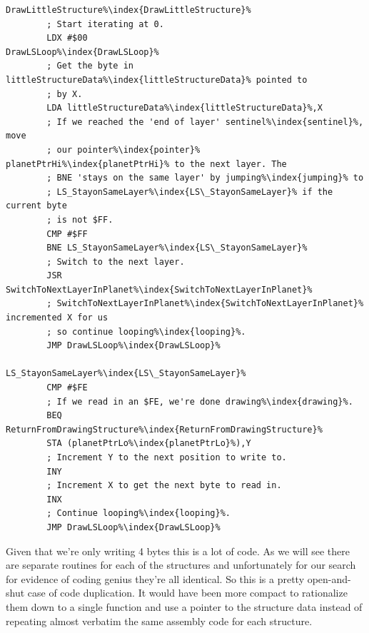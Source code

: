 \begin{lstlisting}[caption=The littlest structure\index{structure} has only two layers.,escapechar=\%]
DrawLittleStructure%\index{DrawLittleStructure}%
        ; Start iterating at 0.
        LDX #$00
DrawLSLoop%\index{DrawLSLoop}%
        ; Get the byte in littleStructureData%\index{littleStructureData}% pointed to
        ; by X.
        LDA littleStructureData%\index{littleStructureData}%,X
        ; If we reached the 'end of layer' sentinel%\index{sentinel}%, move
        ; our pointer%\index{pointer}% planetPtrHi%\index{planetPtrHi}% to the next layer. The
        ; BNE 'stays on the same layer' by jumping%\index{jumping}% to
        ; LS_StayonSameLayer%\index{LS\_StayonSameLayer}% if the current byte
        ; is not $FF.
        CMP #$FF
        BNE LS_StayonSameLayer%\index{LS\_StayonSameLayer}%
        ; Switch to the next layer.
        JSR SwitchToNextLayerInPlanet%\index{SwitchToNextLayerInPlanet}%
        ; SwitchToNextLayerInPlanet%\index{SwitchToNextLayerInPlanet}% incremented X for us
        ; so continue looping%\index{looping}%.
        JMP DrawLSLoop%\index{DrawLSLoop}%

LS_StayonSameLayer%\index{LS\_StayonSameLayer}%   
        CMP #$FE
        ; If we read in an $FE, we're done drawing%\index{drawing}%.
        BEQ ReturnFromDrawingStructure%\index{ReturnFromDrawingStructure}%
        STA (planetPtrLo%\index{planetPtrLo}%),Y
        ; Increment Y to the next position to write to.
        INY
        ; Increment X to get the next byte to read in.
        INX
        ; Continue looping%\index{looping}%.
        JMP DrawLSLoop%\index{DrawLSLoop}%
\end{lstlisting}

Given that we're only writing 4 bytes this is a lot of code. As we will see there are separate routines for each
of the structures and unfortunately for our search for evidence of coding genius they're all identical. So this
is a pretty open-and-shut case of code duplication. It would have been more compact to rationalize them down to a single function
and use a pointer to the structure data instead of repeating almost verbatim the same assembly code for each
structure. 

